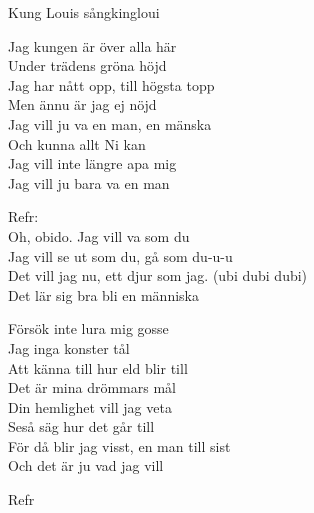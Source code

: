 \begin{song}{Kung Louis sång}{kingloui}
\begin{vers}
Jag kungen är över alla här\\
Under trädens gröna höjd\\
Jag har nått opp, till högsta topp\\
Men ännu är jag ej nöjd\\
Jag vill ju va en man, en mänska\\
Och kunna allt Ni kan\\
Jag vill inte längre apa mig\\
Jag vill ju bara va en man\\
\end{vers}
\begin{vers}
Refr:\\
Oh, obido. Jag vill va som du\\
Jag vill se ut som du, gå som du-u-u\\
Det vill jag nu, ett djur som jag. (ubi dubi dubi)\\
Det lär sig bra bli en människa\\
\end{vers}
\begin{vers}
Försök inte lura mig gosse\\
Jag inga konster tål\\
Att känna till hur eld blir till\\
Det är mina drömmars mål\\
Din hemlighet vill jag veta\\
Seså säg hur det går till\\
För då blir jag visst, en man till sist\\
Och det är ju vad jag vill\\
\end{vers}
\begin{vers}
Refr\\
\end{vers}
\end{song}
